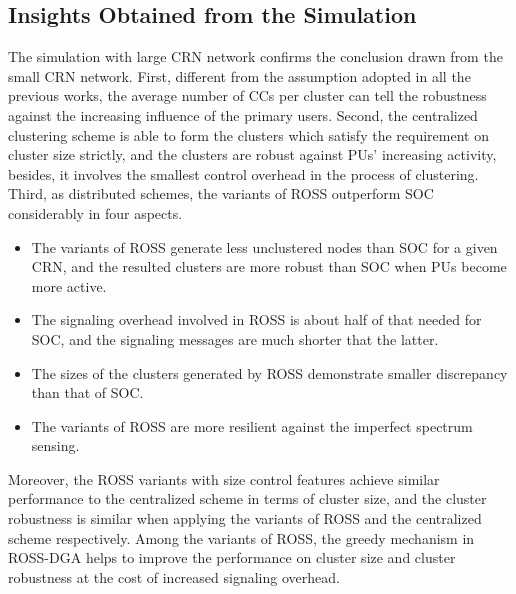 \documentclass[times]{ettauth}
\theoremstyle{mytheoremstyle}
\theoremstyle{mytheoremstyle}
\theoremstyle{mytheoremstyle}
\begin{document}
\subsection{Insights Obtained from the Simulation}
The simulation with large CRN network confirms the conclusion drawn from the small CRN network.
First, different from the assumption adopted in all the previous works, the average number of CCs per cluster can tell the robustness against the increasing influence of the primary users.
Second, the centralized clustering scheme is able to form the clusters which satisfy the requirement on cluster size strictly, and the clusters are robust against PUs' increasing activity, besides, it involves the smallest control overhead in the process of clustering.
Third, as distributed schemes, the variants of ROSS outperform SOC considerably in four aspects.
\begin{itemize}
\item The variants of ROSS generate less unclustered nodes than SOC for a given CRN, and the resulted clusters are more robust than SOC when PUs become more active.
\item The signaling overhead involved in ROSS is about half of that needed for SOC, and the signaling messages are much shorter that the latter.
\item The sizes of the clusters generated by ROSS demonstrate smaller discrepancy than that of SOC.
\item The variants of ROSS are more resilient against the imperfect spectrum sensing.
\end{itemize}

Moreover, the ROSS variants with size control features achieve similar performance to the centralized scheme in terms of cluster size, and the cluster robustness is similar when applying the variants of ROSS and the centralized scheme respectively.
%
Among the variants of ROSS, the greedy mechanism in ROSS-DGA helps to improve the performance on cluster size and cluster robustness at the cost of increased signaling overhead.
\end{document}
